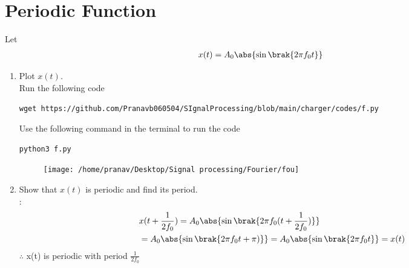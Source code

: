 \documentclass[journal,12pt,twocolumn]{IEEEtran}
\renewcommand\thesection{\arabic{section}}
\begin{document}
\section{Periodic Function}
Let 
\begin{align}
	x(t) &= A_0\abs{\sin\brak{2\pi f_0 t}}
	\label{eq:10-orig-diff-def}
\end{align}
\begin{enumerate}[label=\thesection.\arabic*
,ref=\thesection.\theenumi]
\item Plot $x(t)$.\\
    \solution
    		Run the following code 
\begin{lstlisting}
wget https://github.com/Pranavb060504/SIgnalProcessing/blob/main/charger/codes/f.py
\end{lstlisting}
Use the following command in the terminal to run the code
\begin{lstlisting}
python3 f.py
\end{lstlisting}
    \begin{figure}[!ht]
			\centering
			\texttt{[image: /home/pranav/Desktop/Signal processing/Fourier/fou]}
			\caption{}
			\label{fig:f}
\end{figure}
\item Show that $x(t)$ is periodic and find its period.\\
    \solution:\begin{align}
    &x(t+\frac{1}{2f_0})=A_0\abs{\sin\brak{2\pi f_0 (t+\frac{1}{2 f_0})}}\\
    &=A_0\abs{\sin\brak{2\pi f_0 t+\pi)}}=A_0\abs{\sin\brak{2\pi f_0 t}}=x(t)
    \end{align}
    $\therefore$ x(t) is periodic with period $\frac{1}{2 f_0}$
\end{enumerate}
\end{document}
